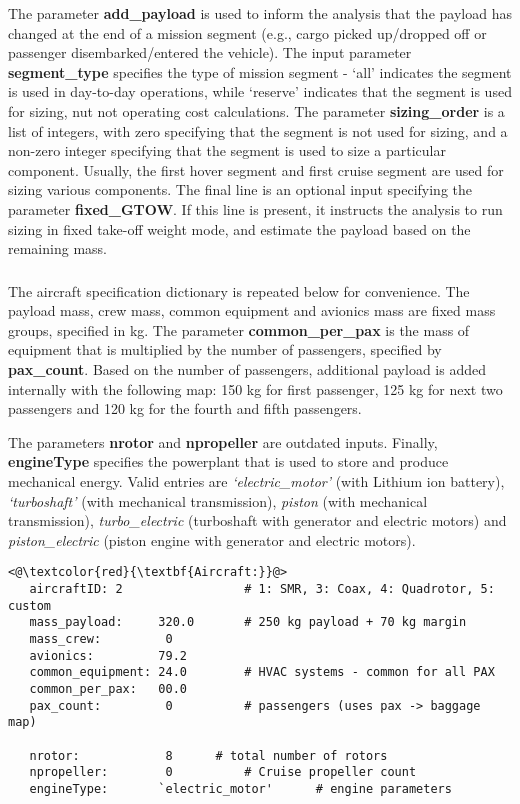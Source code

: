 The parameter \textbf{add\_payload} is used to inform the analysis that the payload has changed at the end of a mission segment (e.g., cargo picked up/dropped off or passenger disembarked/entered the vehicle). The input parameter \textbf{segment\_type} specifies the type of mission segment - `all' indicates the segment is used in day-to-day operations, while `reserve' indicates that the segment is used for sizing, nut not operating cost calculations. The parameter \textbf{sizing\_order} is a list of integers, with zero specifying that the segment is not used for sizing, and a non-zero integer specifying that the segment is used to size a particular component. Usually, the first hover segment and first cruise segment are used for sizing various components. The final line is an optional input specifying the parameter \textbf{fixed\_GTOW}. If this line is present, it instructs the analysis to run sizing in fixed take-off weight mode, and estimate the payload based on the remaining mass. 

\subsubsection{}

The aircraft specification dictionary is repeated below for convenience. The payload mass, crew mass, common equipment and avionics mass are fixed mass groups, specified in kg. The parameter \textbf{common\_per\_pax} is the mass of equipment that is multiplied by the number of passengers, specified by \textbf{pax\_count}. Based on the number of passengers, additional payload is added internally with the following map: 150 kg for first passenger, 125 kg for next two passengers and 120 kg for the fourth and fifth passengers.

The parameters \textbf{nrotor} and \textbf{npropeller} are outdated inputs. Finally, \textbf{engineType} specifies the powerplant that is used to store and produce mechanical energy. Valid entries are \emph{`electric\_motor'} (with Lithium ion battery), \emph{`turboshaft'} (with mechanical transmission), \emph{piston} (with mechanical transmission), \emph{turbo\_electric} (turboshaft with generator and electric motors) and \emph{piston\_electric} (piston engine with generator and electric motors). 

\begin{lstlisting}
<@\textcolor{red}{\textbf{Aircraft:}}@>
   aircraftID: 2                 # 1: SMR, 3: Coax, 4: Quadrotor, 5: custom
   mass_payload:     320.0       # 250 kg payload + 70 kg margin
   mass_crew:         0 
   avionics:         79.2
   common_equipment: 24.0        # HVAC systems - common for all PAX
   common_per_pax:   00.0
   pax_count:         0          # passengers (uses pax -> baggage map)

   nrotor:            8 	 # total number of rotors
   npropeller:        0          # Cruise propeller count
   engineType:       `electric_motor' 	   # engine parameters
\end{lstlisting}


